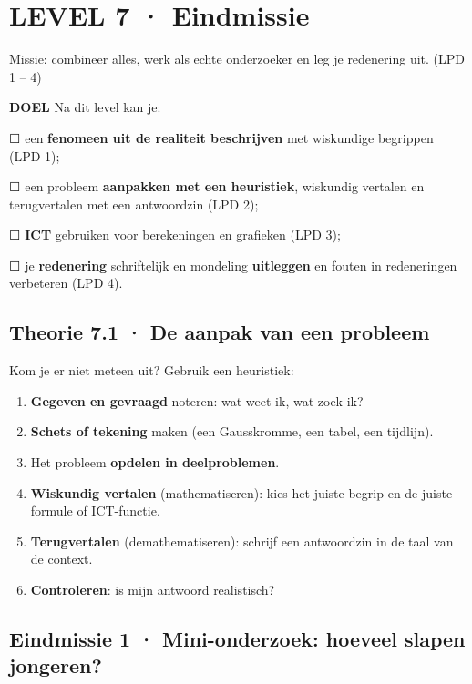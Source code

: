 \section{LEVEL 7 · Eindmissie}

\begin{missie}
Missie: combineer alles, werk als echte onderzoeker en leg je redenering uit. (LPD 1 – 4)
\end{missie}

\begin{doel}
\textbf{DOEL} \quad Na dit level kan je:

☐ een \textbf{fenomeen uit de realiteit beschrijven} met wiskundige begrippen (LPD 1);

☐ een probleem \textbf{aanpakken met een heuristiek}, wiskundig vertalen en terugvertalen met een antwoordzin (LPD 2);

☐ \textbf{ICT} gebruiken voor berekeningen en grafieken (LPD 3);

☐ je \textbf{redenering} schriftelijk en mondeling \textbf{uitleggen} en fouten in redeneringen verbeteren (LPD 4).
\end{doel}

\subsection*{Theorie 7.1 · De aanpak van een probleem}

\begin{theorie}
Kom je er niet meteen uit? Gebruik een heuristiek:

\begin{enumerate}
\item \textbf{Gegeven en gevraagd} noteren: wat weet ik, wat zoek ik?
\item \textbf{Schets of tekening} maken (een Gausskromme, een tabel, een tijdlijn).
\item Het probleem \textbf{opdelen in deelproblemen}.
\item \textbf{Wiskundig vertalen} (mathematiseren): kies het juiste begrip en de juiste formule of ICT-functie.
\item \textbf{Terugvertalen} (demathematiseren): schrijf een antwoordzin in de taal van de context.
\item \textbf{Controleren}: is mijn antwoord realistisch?
\end{enumerate}
\end{theorie}

\subsection*{Eindmissie 1 · Mini-onderzoek: hoeveel slapen jongeren?}

